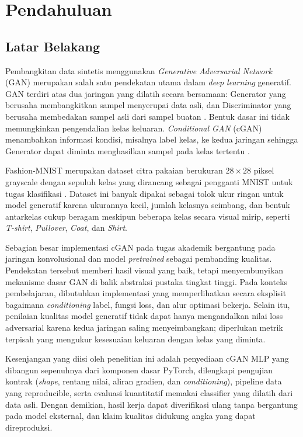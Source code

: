 \chapter{Pendahuluan}

\section{Latar Belakang}

Pembangkitan data sintetis menggunakan \textit{Generative Adversarial Network} (GAN) merupakan salah satu pendekatan utama dalam \textit{deep learning} generatif. GAN terdiri atas dua jaringan yang dilatih secara bersamaan: Generator yang berusaha membangkitkan sampel menyerupai data asli, dan Discriminator yang berusaha membedakan sampel asli dari sampel buatan \citep{goodfellow2014generative}. Bentuk dasar ini tidak memungkinkan pengendalian kelas keluaran. \textit{Conditional GAN} (cGAN) menambahkan informasi kondisi, misalnya label kelas, ke kedua jaringan sehingga Generator dapat diminta menghasilkan sampel pada kelas tertentu \citep{mirza2014conditional}.

Fashion-MNIST merupakan dataset citra pakaian berukuran $28\times28$ piksel grayscale dengan sepuluh kelas yang dirancang sebagai pengganti MNIST untuk tugas klasifikasi \citep{xiao2017fashion}. Dataset ini banyak dipakai sebagai tolok ukur ringan untuk model generatif karena ukurannya kecil, jumlah kelasnya seimbang, dan bentuk antarkelas cukup beragam meskipun beberapa kelas secara visual mirip, seperti \textit{T-shirt}, \textit{Pullover}, \textit{Coat}, dan \textit{Shirt}.

Sebagian besar implementasi cGAN pada tugas akademik bergantung pada jaringan konvolusional dan model \textit{pretrained} sebagai pembanding kualitas. Pendekatan tersebut memberi hasil visual yang baik, tetapi menyembunyikan mekanisme dasar GAN di balik abstraksi pustaka tingkat tinggi. Pada konteks pembelajaran, dibutuhkan implementasi yang memperlihatkan secara eksplisit bagaimana \textit{conditioning} label, fungsi loss, dan alur optimasi bekerja. Selain itu, penilaian kualitas model generatif tidak dapat hanya mengandalkan nilai loss adversarial karena kedua jaringan saling menyeimbangkan; diperlukan metrik terpisah yang mengukur kesesuaian keluaran dengan kelas yang diminta.

Kesenjangan yang diisi oleh penelitian ini adalah penyediaan cGAN MLP yang dibangun sepenuhnya dari komponen dasar PyTorch, dilengkapi pengujian kontrak (\textit{shape}, rentang nilai, aliran gradien, dan \textit{conditioning}), pipeline data yang reproducible, serta evaluasi kuantitatif memakai classifier yang dilatih dari data asli. Dengan demikian, hasil kerja dapat diverifikasi ulang tanpa bergantung pada model eksternal, dan klaim kualitas didukung angka yang dapat direproduksi.

